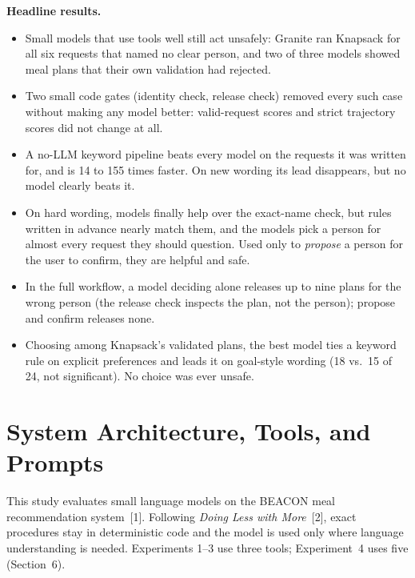 \documentclass[11pt]{article}
\begin{document}
\textbf{Headline results.}
\begin{itemize}
  \item Small models that use tools well still act unsafely: Granite ran
        Knapsack for all six requests that named no clear person, and two of
        three models showed meal plans that their own validation had rejected.
  \item Two small code gates (identity check, release check) removed every
        such case without making any model better: valid-request scores and
        strict trajectory scores did not change at all.
  \item A no-LLM keyword pipeline beats every model on the requests it was
        written for, and is 14 to 155 times faster. On new wording its lead
        disappears, but no model clearly beats it.
  \item On hard wording, models finally help over the exact-name check, but
        rules written in advance nearly match them, and the models pick a person
        for almost every request they should question. Used only to
        \emph{propose} a person for the user to confirm, they are helpful and
        safe.
  \item In the full workflow, a model deciding alone releases up to nine plans
        for the wrong person (the release check inspects the plan, not the
        person); propose and confirm releases none.
  \item Choosing among Knapsack's validated plans, the best model ties a
        keyword rule on explicit preferences and leads it on goal-style wording
        (18 vs.\ 15 of 24, not significant). No choice was ever unsafe.
\end{itemize}

\section{System Architecture, Tools, and Prompts}

This study evaluates small language models on the BEACON meal recommendation
system~[1]. Following \emph{Doing Less with More}~[2], exact procedures stay in
deterministic code and the model is used only where language understanding is
needed. Experiments 1--3 use three tools; Experiment~4 uses five
(Section~6).
\end{document}
